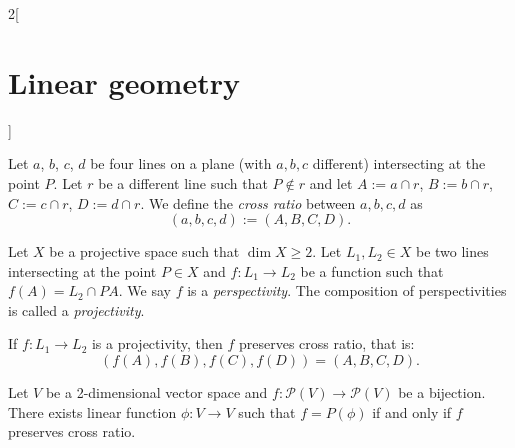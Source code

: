 \documentclass[../../../main.tex]{subfiles}
\begin{document}
\begin{multicols}{2}[\section{Linear geometry}]
\begin{definition}
  \end{definition}
  \begin{definition}
    Let $a$, $b$, $c$, $d$ be four lines on a plane (with $a,b,c$ different) intersecting at the point $P$. Let $r$ be a different line such that $P\notin r$ and let $A:=a\cap r$, $B:=b\cap r$, $C:=c\cap r$, $D:=d\cap r$. We define the \emph{cross ratio} between $a,b,c,d$ as $$(a,b,c,d):=(A,B,C,D).$$
  \end{definition}
  \begin{definition}
    Let $X$ be a projective space such that $\dim X\geq 2$. Let $L_1,L_2\in X$ be two lines intersecting at the point $P\in X$ and $f:L_1\rightarrow L_2$ be a function such that $f(A)=L_2\cap PA$. We say $f$ is a \emph{perspectivity}. The composition of perspectivities is called a \emph{projectivity}.
  \end{definition}
  \begin{theorem}
    If $f:L_1\rightarrow L_2$ is a projectivity, then $f$ preserves cross ratio, that is: $$(f(A),f(B),f(C),f(D))=(A,B,C,D).$$
  \end{theorem}
  \begin{theorem}
    Let $V$ be a 2-dimensional vector space and $f:\mathcal{P}(V)\rightarrow \mathcal{P}(V)$ be a bijection. There exists linear function $\phi:V\rightarrow V$ such that $f=P(\phi)$ if and only if $f$ preserves cross ratio.
  \end{theorem}

\end{multicols}
\end{document}
